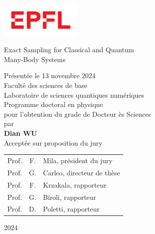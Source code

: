 
\begin{titlepage}
\begin{otherlanguage}{french}

\sffamily

\begin{flushleft}
\parbox{0.3\textwidth}{\includegraphics[width=4cm]{images/epfl}}
\end{flushleft}

\begin{flushright}
\phantom{Thèse n.~TODO}
\end{flushright}

\null\vspace{2cm}

\begin{minipage}{4cm}
\end{minipage}
\hfill
\begin{minipage}{11cm}
{\Large Exact Sampling for Classical and Quantum \\[8pt] Many-Body Systems} \\

\vspace{2cm}

\small
Présentée le 13 novembre 2024 \\[8pt]
Faculté des sciences de base \\
Laboratoire de sciences quantiques numériques \\
Programme doctoral en physique \\

pour l'obtention du grade de Docteur ès Sciences \\[8pt]
par \\ [12pt]
{\Large \textbf{Dian WU}} \\[9pt]

Acceptée sur proposition du jury \\[5pt]
\setlength{\tabcolsep}{1.5pt}
\begin{tabular}{@{}lcl}
Prof. & F. & Mila, président du jury \\
Prof. & G. & Carleo, directeur de thèse \\
Prof. & F. & Krzakala, rapporteur \\
Prof. & G. & Biroli, rapporteur \\
Prof. & D. & Poletti, rapporteur \\
\end{tabular}
\end{minipage}
\vspace{2.33cm}
\begin{flushright}
2024
\end{flushright}

\end{otherlanguage}
\end{titlepage}
